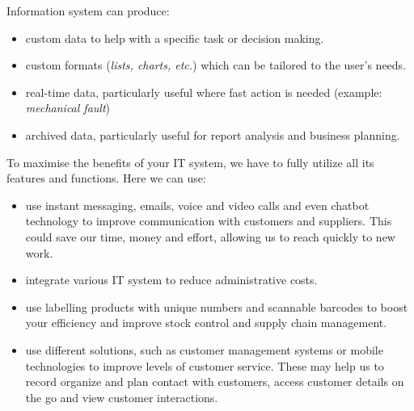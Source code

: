 \documentclass[10pt]{article}
\begin{document}
Information system can produce:
\begin{itemize}
  \item custom data to help with a specific task or decision making.

  \item custom formats (\textit{lists, charts, etc.}) which can be tailored to the user's 
    needs.

  \item real-time data, particularly useful where fast action is needed (example: \textit
    {mechanical fault})

  \item archived data, particularly useful for report analysis and business planning.

\end{itemize}

To maximise the benefits of your IT system, we have to fully utilize all its features
and functions. Here we can use:
\begin{itemize}
  \item use instant messaging, emails, voice and video calls and even chatbot technology
    to improve communication with customers and suppliers. This could save our time, money
    and effort, allowing us to reach quickly to new work.

  \item integrate various IT system to reduce administrative costs.

  \item use labelling products with unique numbers and scannable barcodes to boost your 
    efficiency and improve stock control and supply chain management.

  \item use different solutions, such as customer management systems or mobile technologies
    to improve levels of customer service. These may help us to record organize and plan 
    contact with customers, access customer details on the go and view customer interactions.
  
\end{itemize}
\end{document}
